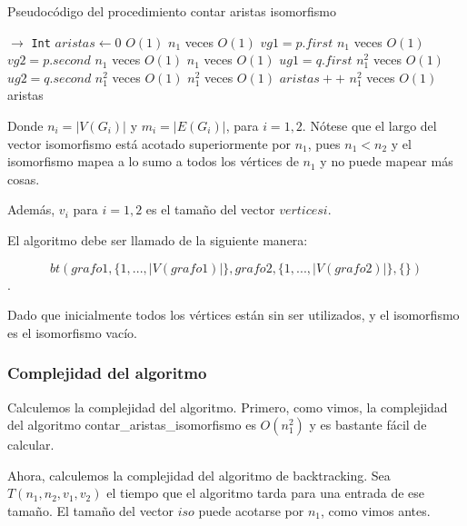 \begin{algorithm}[H]
  \begin{algorithmic}[1]
  \caption{Pseudocódigo del procedimiento contar aristas isomorfismo}
  \label{algo:2-2}
     $\to$ \texttt{Int}
      \State $aristas \gets 0$
      \Comment $O(1)$
         \Comment $n_1$ veces $O(1)$ 
         \State $vg1 = p.first$
         \Comment $n_1$ veces $O(1)$ 
         \State $vg2 = p.second$
         \Comment $n_1$ veces $O(1)$ 
           \Comment $n_1$ veces $O(1)$
           \State $ug1 = q.first$
           \Comment $n_1^2$ veces $O(1)$
           \State $ug2 = q.second$
           \Comment $n_1^2$ veces $O(1)$
           \Comment $n_1^2$ veces $O(1)$
             \State $aristas++$
             \Comment $n_1^2$ veces $O(1)$
           \EndIf
         \EndFor
       \EndFor
     \Return aristas
		\EndProcedure
	\end{algorithmic}
\end{algorithm}

Donde $n_i = |V(G_i)|$ y $m_i = |E(G_i)|$, para $i = 1, 2$. Nótese que el largo del vector isomorfismo está acotado superiormente por $n_1$, pues $n_1 < n_2$ y el isomorfismo mapea a lo sumo a todos los vértices de $n_1$ y no puede mapear más cosas. 

Además, $v_i$ para $i = 1,2$ es el tamaño del vector $verticesi$.


El algoritmo debe ser llamado de la siguiente manera:

\[bt(grafo1, \{1,...,|V(grafo1)|\}, grafo2, \{1,...,|V(grafo2)|\}, \{ \})\].

Dado que inicialmente todos los vértices están sin ser utilizados, y el isomorfismo es el isomorfismo vacío.

\subsubsection{Complejidad del algoritmo}

Calculemos la complejidad del algoritmo. Primero, como vimos, la complejidad del algoritmo contar\_aristas\_isomorfismo es $O(n_1^2)$ y es bastante fácil de calcular.

Ahora, calculemos la complejidad del algoritmo de backtracking. Sea $T(n_1, n_2, v_1, v_2)$ el tiempo que el algoritmo tarda para una entrada de ese tamaño. El tamaño del vector $iso$ puede acotarse por $n_1$, como vimos antes.

